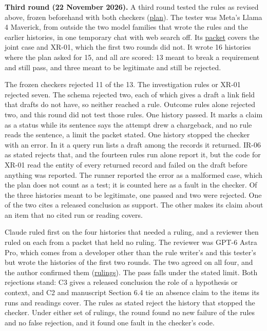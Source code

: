 \documentclass[
  11pt,
]{article}
\begin{document}
\textbf{Third round (22 November 2026).} A third round tested the rules
as revised above, frozen beforehand with both checkers
(\href{tools/adversarial_cases/round3/PLAN.md}{plan}). The tester was
Meta's Llama 4 Maverick, from outside the two model families that wrote
the rules and the earlier histories, in one temporary chat with web
search off. Its \href{tools/adversarial_cases/PACKET_ROUND3.md}{packet}
covers the joint case and \mbox{XR-01}, which the first two rounds did
not. It wrote 16 histories where the plan asked for 15, and all are
scored: 13 meant to break a requirement and still pass, and three meant
to be legitimate and still be rejected.

The frozen checkers rejected 11 of the 13. The investigation rules or
\mbox{XR-01} rejected seven. The schema rejected two, each of which
gives a draft a link field that drafts do not have, so neither reached a
rule. Outcome rules alone rejected two, and this round did not test
those rules. One history passed. It marks a claim as a status while its
sentence says the attempt drew a chargeback, and no rule reads the
sentence, a limit the packet stated. One history stopped the checker
with an error. In it a query run lists a draft among the records it
returned. \mbox{IR-06} as stated rejects that, and the fourteen rules
run alone report it, but the code for \mbox{XR-01} read the entity of
every returned record and failed on the draft before anything was
reported. The runner reported the error as a malformed case, which the
plan does not count as a test; it is counted here as a fault in the
checker. Of the three histories meant to be legitimate, one passed and
two were rejected. One of the two cites a released conclusion as
support. The other makes its claim about an item that no cited run or
reading covers.

Claude ruled first on the four histories that needed a ruling, and a
reviewer then ruled on each from a packet that held no ruling. The
reviewer was \mbox{GPT-6} Astra Pro, which comes from a developer other
than the rule writer's and this tester's but wrote the histories of the
first two rounds. The two agreed on all four, and the author confirmed
them (\href{tools/adversarial_cases/round3/ADJUDICATION.md}{rulings}).
The pass falls under the stated limit. Both rejections stand: C3 gives a
released conclusion the role of a hypothesis or context, and C2 and
manuscript Section 6.4 tie an absence claim to the items its runs and
readings cover. The rules as stated reject the history that stopped the
checker. Under either set of rulings, the round found no new failure of
the rules and no false rejection, and it found one fault in the
checker's code.
\end{document}

